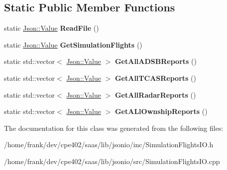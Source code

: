 \subsection*{Static Public Member Functions}
\begin{DoxyCompactItemize}
\item 
\hypertarget{class_simulation_flights_i_o_a4403f368173eeaf850e4d161e00d064f}{}static \hyperlink{class_json_1_1_value}{Json\+::\+Value} {\bfseries Read\+File} ()\label{class_simulation_flights_i_o_a4403f368173eeaf850e4d161e00d064f}

\item 
\hypertarget{class_simulation_flights_i_o_a0fecd6176618527ce882c1bd705cea2e}{}static \hyperlink{class_json_1_1_value}{Json\+::\+Value} {\bfseries Get\+Simulation\+Flights} ()\label{class_simulation_flights_i_o_a0fecd6176618527ce882c1bd705cea2e}

\item 
\hypertarget{class_simulation_flights_i_o_ab80deb0dbd2eff210c5a24211fbb0319}{}static std\+::vector$<$ \hyperlink{class_json_1_1_value}{Json\+::\+Value} $>$ {\bfseries Get\+All\+A\+D\+S\+B\+Reports} ()\label{class_simulation_flights_i_o_ab80deb0dbd2eff210c5a24211fbb0319}

\item 
\hypertarget{class_simulation_flights_i_o_ac54cf3a5ddcda61e56fbf523cfe7c541}{}static std\+::vector$<$ \hyperlink{class_json_1_1_value}{Json\+::\+Value} $>$ {\bfseries Get\+All\+T\+C\+A\+S\+Reports} ()\label{class_simulation_flights_i_o_ac54cf3a5ddcda61e56fbf523cfe7c541}

\item 
\hypertarget{class_simulation_flights_i_o_aec11fa10f5610c6505c0ffe8c59ded5b}{}static std\+::vector$<$ \hyperlink{class_json_1_1_value}{Json\+::\+Value} $>$ {\bfseries Get\+All\+Radar\+Reports} ()\label{class_simulation_flights_i_o_aec11fa10f5610c6505c0ffe8c59ded5b}

\item 
\hypertarget{class_simulation_flights_i_o_a047aa637503e4988f9b9c0da284a601b}{}static std\+::vector$<$ \hyperlink{class_json_1_1_value}{Json\+::\+Value} $>$ {\bfseries Get\+A\+Ll\+Ownship\+Reports} ()\label{class_simulation_flights_i_o_a047aa637503e4988f9b9c0da284a601b}

\end{DoxyCompactItemize}


The documentation for this class was generated from the following files\+:\begin{DoxyCompactItemize}
\item 
/home/frank/dev/cpe402/saas/lib/jsonio/inc/Simulation\+Flights\+I\+O.\+h\item 
/home/frank/dev/cpe402/saas/lib/jsonio/src/Simulation\+Flights\+I\+O.\+cpp\end{DoxyCompactItemize}
